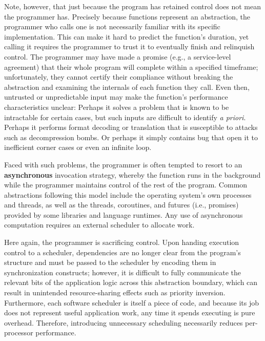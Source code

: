 \documentclass[12pt,letterpaper,openright]{report}
\begin{document}
Note, however, that just because the program has retained control does not mean the
programmer has.  Precisely because functions represent an abstraction, the programmer
who calls one is not necessarily familiar with its specific implementation.  This can
make it hard to predict the function's duration, yet calling it requires the
programmer to trust it to eventually finish and relinquish control.  The programmer
may have made a promise (e.g., a service-level agreement) that their whole program
will complete within a specified timeframe; unfortunately, they cannot certify their
compliance without breaking the abstraction and examining the internals of each
function they call.  Even then, untrusted or unpredictable input may make the
function's performance characteristics unclear:  Perhaps it solves a problem that is
known to be intractable for certain cases, but such inputs are difficult to identify
\textit{a priori}.  Perhaps it performs format decoding or translation that is
susceptible to attacks such as decompression bombs.  Or perhaps it simply contains
bug that open it to inefficient corner cases or even an infinite loop.

Faced with such problems, the programmer is often tempted to resort to an
\textbf{asynchronous} invocation strategy, whereby the function runs in the
background while the programmer maintains control of the rest of the program.  Common
abstractions following this model include the operating system's own processes and
threads, as well as the threads, coroutines, and futures (i.e., promises) provided by
some libraries and language runtimes.  Any use of asynchronous computation requires
an external scheduler to allocate work.

Here again, the programmer is sacrificing control.  Upon handing execution control to
a scheduler, dependencies are no longer clear from the program's structure and must
be passed to the scheduler by encoding them in synchronization constructs; however,
it is difficult to fully communicate the relevant bits of the application logic
across this abstraction boundary, which can result in unintended resource-sharing
effects such as priority inversion.  Furthermore, each software scheduler is itself a
piece of code, and because its job does not represent useful application work, any
time it spends executing is pure overhead.  Therefore, introducing unnecessary
scheduling necessarily reduces per-processor performance.
\end{document}
